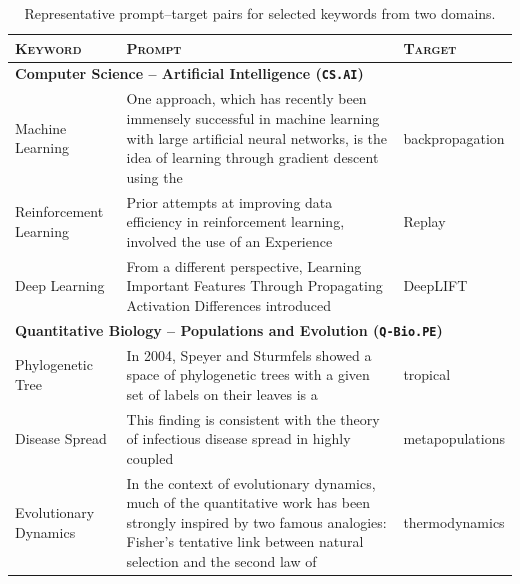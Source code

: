 \documentclass[10pt]{article}
\begin{document}
\begin{table}[t]
    \centering
    \caption{Representative prompt--target pairs for selected keywords from two domains.}
    \renewcommand{\arraystretch}{1.2}
    \small
    \begin{tabular}{p{3.2cm}p{9.5cm}p{1.8cm}}
\toprule
\textsc{Keyword} & \textsc{Prompt} & \textsc{Target} \\
\midrule
\multicolumn{3}{l}{\textbf{Computer Science -- Artificial Intelligence (\texttt{CS.AI})}} \\
\midrule
Machine Learning & One approach, which has recently been immensely successful in machine learning with large artificial neural networks, is the idea of learning through gradient descent using the & backpropagation \\
Reinforcement Learning & Prior attempts at improving data efficiency in reinforcement learning, involved the use of an Experience & Replay \\
Deep Learning & From a different perspective, Learning Important Features Through Propagating Activation Differences introduced & DeepLIFT \\
\midrule
\multicolumn{3}{l}{\textbf{Quantitative Biology -- Populations and Evolution (\texttt{Q-Bio.PE})}} \\
\midrule
Phylogenetic Tree & In 2004, Speyer and Sturmfels showed a space of phylogenetic trees with a given set of labels on their leaves is a & tropical \\
Disease Spread & This finding is consistent with the theory of infectious disease spread in highly coupled & metapopulations \\
Evolutionary Dynamics & In the context of evolutionary dynamics, much of the quantitative work has been strongly inspired by two famous analogies: Fisher's tentative link between natural selection and the second law of & thermodynamics \\
\bottomrule
    \end{tabular}
    \label{tab:prompt-target-main}
\end{table}
\end{document}
